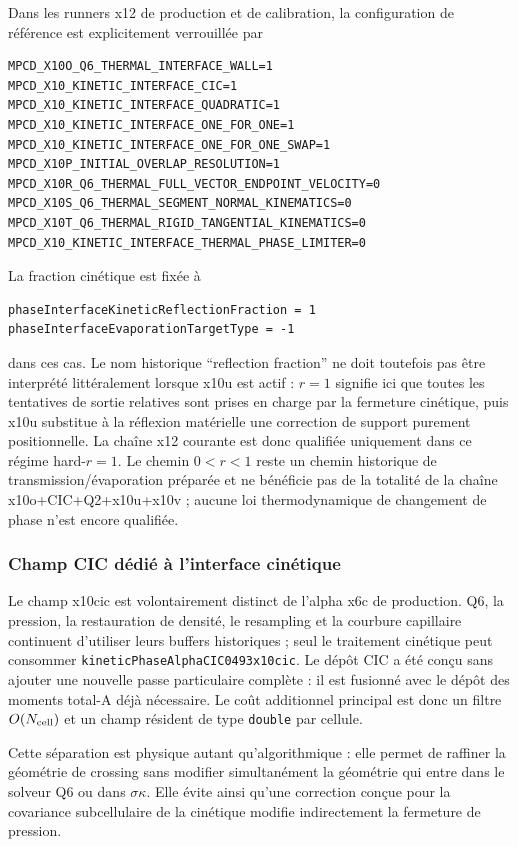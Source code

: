\documentclass[11pt,a4paper]{article}
\begin{document}
Dans les runners x12 de production et de calibration, la configuration de référence est explicitement verrouillée par
\begin{verbatim}
MPCD_X10O_Q6_THERMAL_INTERFACE_WALL=1
MPCD_X10_KINETIC_INTERFACE_CIC=1
MPCD_X10_KINETIC_INTERFACE_QUADRATIC=1
MPCD_X10_KINETIC_INTERFACE_ONE_FOR_ONE=1
MPCD_X10_KINETIC_INTERFACE_ONE_FOR_ONE_SWAP=1
MPCD_X10P_INITIAL_OVERLAP_RESOLUTION=1
MPCD_X10R_Q6_THERMAL_FULL_VECTOR_ENDPOINT_VELOCITY=0
MPCD_X10S_Q6_THERMAL_SEGMENT_NORMAL_KINEMATICS=0
MPCD_X10T_Q6_THERMAL_RIGID_TANGENTIAL_KINEMATICS=0
MPCD_X10_KINETIC_INTERFACE_THERMAL_PHASE_LIMITER=0
\end{verbatim}
La fraction cinétique est fixée à
\begin{verbatim}
phaseInterfaceKineticReflectionFraction = 1
phaseInterfaceEvaporationTargetType = -1
\end{verbatim}
dans ces cas. Le nom historique ``reflection fraction'' ne doit toutefois pas être interprété littéralement lorsque x10u est actif : $r=1$ signifie ici que toutes les tentatives de sortie relatives sont prises en charge par la fermeture cinétique, puis x10u substitue à la réflexion matérielle une correction de support purement positionnelle. La chaîne x12 courante est donc qualifiée uniquement dans ce régime hard-$r=1$. Le chemin $0<r<1$ reste un chemin historique de transmission/évaporation préparée et ne bénéficie pas de la totalité de la chaîne x10o+CIC+Q2+x10u+x10v ; aucune loi thermodynamique de changement de phase n'est encore qualifiée.

\subsubsection{Champ CIC dédié à l'interface cinétique}

Le champ x10cic est volontairement distinct de l'alpha x6c de production. Q6, la pression, la restauration de densité, le resampling et la courbure capillaire continuent d'utiliser leurs buffers historiques ; seul le traitement cinétique peut consommer
\texttt{kineticPhaseAlphaCIC0493x10cic}. Le dépôt CIC a été conçu sans ajouter une nouvelle passe particulaire complète : il est fusionné avec le dépôt des moments total-A déjà nécessaire. Le coût additionnel principal est donc un filtre $O(N_{\rm cell})$ et un champ résident de type \texttt{double} par cellule.

Cette séparation est physique autant qu'algorithmique : elle permet de raffiner la géométrie de crossing sans modifier simultanément la géométrie qui entre dans le solveur Q6 ou dans $\sigma\kappa$. Elle évite ainsi qu'une correction conçue pour la covariance subcellulaire de la cinétique modifie indirectement la fermeture de pression.
\end{document}
